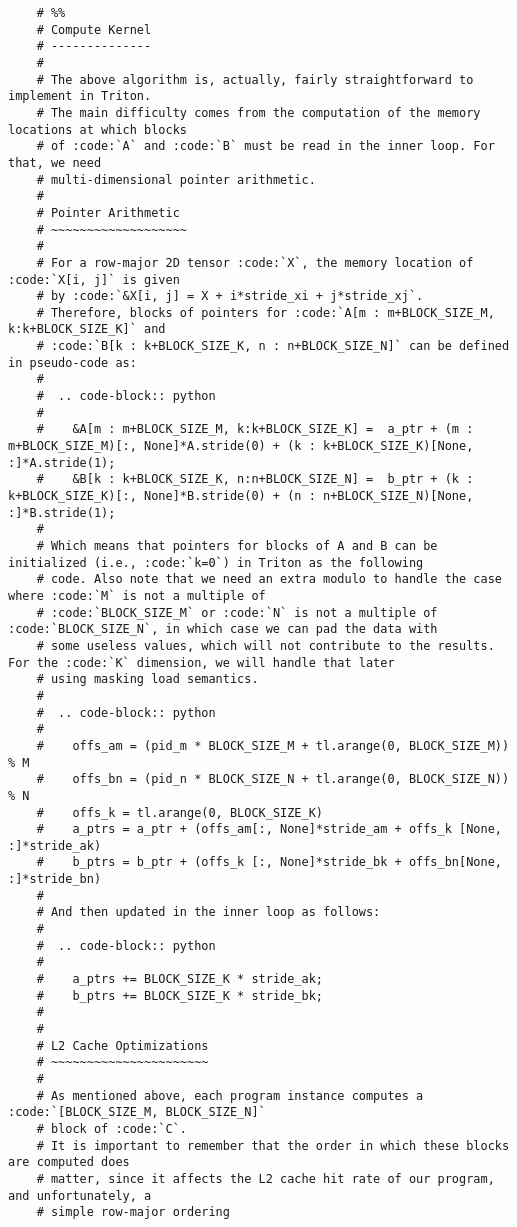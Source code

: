 \documentclass{article}
\begin{document}
\begin{lstlisting}
    # %%
    # Compute Kernel
    # --------------
    #
    # The above algorithm is, actually, fairly straightforward to implement in Triton.
    # The main difficulty comes from the computation of the memory locations at which blocks
    # of :code:`A` and :code:`B` must be read in the inner loop. For that, we need
    # multi-dimensional pointer arithmetic.
    #
    # Pointer Arithmetic
    # ~~~~~~~~~~~~~~~~~~~
    #
    # For a row-major 2D tensor :code:`X`, the memory location of :code:`X[i, j]` is given
    # by :code:`&X[i, j] = X + i*stride_xi + j*stride_xj`.
    # Therefore, blocks of pointers for :code:`A[m : m+BLOCK_SIZE_M, k:k+BLOCK_SIZE_K]` and
    # :code:`B[k : k+BLOCK_SIZE_K, n : n+BLOCK_SIZE_N]` can be defined in pseudo-code as:
    #
    #  .. code-block:: python
    #
    #    &A[m : m+BLOCK_SIZE_M, k:k+BLOCK_SIZE_K] =  a_ptr + (m : m+BLOCK_SIZE_M)[:, None]*A.stride(0) + (k : k+BLOCK_SIZE_K)[None, :]*A.stride(1);
    #    &B[k : k+BLOCK_SIZE_K, n:n+BLOCK_SIZE_N] =  b_ptr + (k : k+BLOCK_SIZE_K)[:, None]*B.stride(0) + (n : n+BLOCK_SIZE_N)[None, :]*B.stride(1);
    #
    # Which means that pointers for blocks of A and B can be initialized (i.e., :code:`k=0`) in Triton as the following
    # code. Also note that we need an extra modulo to handle the case where :code:`M` is not a multiple of
    # :code:`BLOCK_SIZE_M` or :code:`N` is not a multiple of :code:`BLOCK_SIZE_N`, in which case we can pad the data with
    # some useless values, which will not contribute to the results. For the :code:`K` dimension, we will handle that later
    # using masking load semantics.
    #
    #  .. code-block:: python
    #
    #    offs_am = (pid_m * BLOCK_SIZE_M + tl.arange(0, BLOCK_SIZE_M)) % M
    #    offs_bn = (pid_n * BLOCK_SIZE_N + tl.arange(0, BLOCK_SIZE_N)) % N
    #    offs_k = tl.arange(0, BLOCK_SIZE_K)
    #    a_ptrs = a_ptr + (offs_am[:, None]*stride_am + offs_k [None, :]*stride_ak)
    #    b_ptrs = b_ptr + (offs_k [:, None]*stride_bk + offs_bn[None, :]*stride_bn)
    #
    # And then updated in the inner loop as follows:
    #
    #  .. code-block:: python
    #
    #    a_ptrs += BLOCK_SIZE_K * stride_ak;
    #    b_ptrs += BLOCK_SIZE_K * stride_bk;
    #
    #
    # L2 Cache Optimizations
    # ~~~~~~~~~~~~~~~~~~~~~~
    #
    # As mentioned above, each program instance computes a :code:`[BLOCK_SIZE_M, BLOCK_SIZE_N]`
    # block of :code:`C`.
    # It is important to remember that the order in which these blocks are computed does
    # matter, since it affects the L2 cache hit rate of our program, and unfortunately, a
    # simple row-major ordering

\end{lstlisting}
\end{document}
